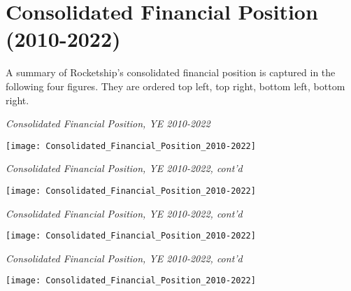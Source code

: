 
\chapter{Consolidated Financial Position (2010-2022)}
\label{ch:consolidated_financial_position}

A summary of Rocketship's consolidated financial position is captured in the following four figures. They are ordered top left, top right, bottom left, bottom right.

\begin{sidewaystable}
  \centering
  \caption[Consolidated Financial Position, Years Ending 2010–2022]{\textit{Consolidated Financial Position, YE 2010-2022}}%
  \label{tab:consolidated_financial_position}
  \texttt{[image: Consolidated\_Financial\_Position\_2010-2022]} %
\end{sidewaystable}

  \begin{sidewaystable}
  \centering
    \caption*{\textit{Consolidated Financial Position, YE 2010-2022, cont'd}}
    \texttt{[image: Consolidated\_Financial\_Position\_2010-2022]} %
  \end{sidewaystable}

  \begin{sidewaystable}
  \centering
    \caption*{\textit{Consolidated Financial Position, YE 2010-2022, cont'd}}
    \texttt{[image: Consolidated\_Financial\_Position\_2010-2022]} %
  \end{sidewaystable}

  \begin{sidewaystable}
  \centering
    \caption*{\textit{Consolidated Financial Position, YE 2010-2022, cont'd}}
    \texttt{[image: Consolidated\_Financial\_Position\_2010-2022]} %
  \end{sidewaystable}
  
